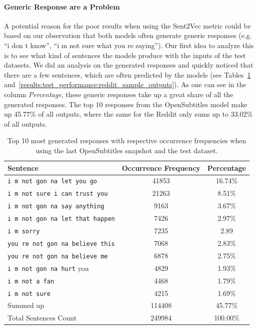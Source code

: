 \paragraph{Generic Response are a Problem} A potential reason for the poor results when using the Sent2Vec metric could be based on our observation that both models often generate generic responses (e.g. ``i don t know'', ``i m not sure what you re saying''). Our first idea to analyze this is to see what kind of sentences the models produce with the inputs of the test datasets. We did an analysis on the generated responses and quickly noticed that there are a few sentences, which are often predicted by the models (see Tables~\ref{results:test_performance:opensubtitles_sample_outputs} and~\ref{results:test_performance:reddit_sample_outputs}). As one can see in the column \emph{Percentage}, these generic responses take up a great share of all the generated responses. The top 10 responses from the OpenSubtitles model make up 45.77\% of all outputs, where the same for the Reddit only sums up to 33.02\% of all outputs.
\\
\begin{table}[H]
	\centering
	\begin{adjustbox}{max width=\textwidth}
		\begin{tabular}{lcc}
			\toprule
			Sentence & Occurrence Frequency & Percentage \\ \midrule
			\texttt{i m not gon na let you go} & 41853 & 16.74\%\\
			\texttt{i m not sure i can trust you} & 21263 & 8.51\%\\
			\texttt{i m not gon na say anything} & 9163 & 3.67\%\\
			\texttt{i m not gon na let that happen} & 7426 & 2.97\%\\
			\texttt{i m sorry} & 7235 & 2.89\\
			\texttt{you re not gon na believe this} & 7068 & 2.83\%\\
			\texttt{you re not gon na believe me} & 6878 & 2.75\%\\
			\texttt{i m not gon na hurt} you & 4829 & 1.93\%\\
			\texttt{i m not a fan} & 4468 & 1.79\%\\
			\texttt{i m not sure} & 4215 & 1.69\%\\
			\midrule
			Summed up & 114408 & 45.77\%\\
			\midrule
			\midrule
			Total Sentences Count & 249984 & 100.00\%\\
			\bottomrule
		\end{tabular}
	\end{adjustbox}
	\caption{Top 10 most generated responses with respective occurrence frequencies when using the last OpenSubtitles snapshot and the test dataset.}
	\label{results:test_performance:opensubtitles_sample_outputs}
\end{table}

